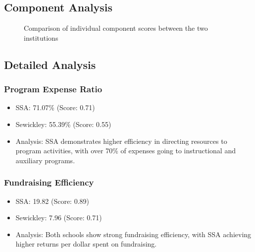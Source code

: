 \documentclass[12pt]{article}
\begin{document}
\subsection{Component Analysis}

\begin{figure}[H]
\centering
{}
\caption{Comparison of individual component scores between the two institutions}
\label{fig:component_comparison}
\end{figure}

\subsection{Detailed Analysis}

\subsubsection{Program Expense Ratio}
\begin{itemize}
    \item SSA: 71.07\% (Score: 0.71)
    \item Sewickley: 55.39\% (Score: 0.55)
    \item Analysis: SSA demonstrates higher efficiency in directing resources to program activities, with over 70\% of expenses going to instructional and auxiliary programs.
\end{itemize}

\subsubsection{Fundraising Efficiency}
\begin{itemize}
    \item SSA: 19.82 (Score: 0.89)
    \item Sewickley: 7.96 (Score: 0.71)
    \item Analysis: Both schools show strong fundraising efficiency, with SSA achieving higher returns per dollar spent on fundraising.
\end{itemize}
\end{document}
